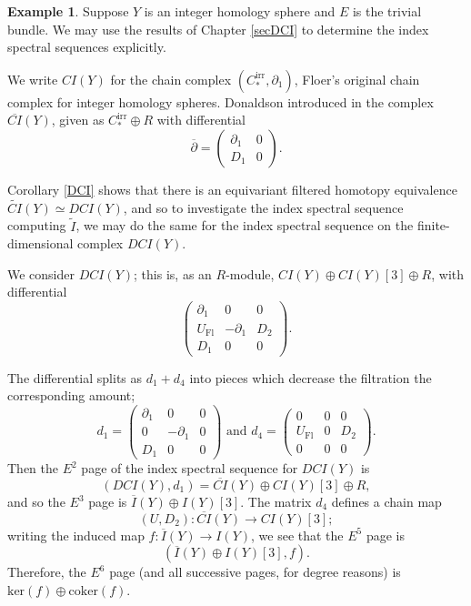 \documentclass{memo-l}
\theoremstyle{definition}
\newtheorem{example}[theorem]{Example}
\theoremstyle{remark}
\numberwithin{section}{chapter}
\numberwithin{equation}{chapter}
\begin{document}
\begin{example} Suppose $Y$ is an integer homology sphere and $E$ is the trivial bundle. We may use the results of Chapter \ref{secDCI} to determine the index spectral sequences explicitly.

We write $CI(Y)$ for the chain complex $(C_*^{\text{irr}}, \partial_1)$, Floer's original chain complex for integer homology spheres. Donaldson introduced in \cite[Section~7.1]{Don} the complex $\overline{CI}(Y)$, given as $C_*^{\text{irr}} \oplus R$ with differential $$\overline \partial = \begin{pmatrix}\partial_1 & 0 \\ D_1 & 0\end{pmatrix}.$$

Corollary \ref{DCI} shows that there is an equivariant filtered homotopy equivalence $\widetilde{CI}(Y) \simeq DCI(Y)$, and so to investigate the index spectral sequence computing $\tilde I$, we may do the same for the index spectral sequence on the finite-dimensional complex $DCI(Y)$. 

We consider $DCI(Y)$; this is, as an $R$-module, $CI(Y) \oplus CI(Y)[3] \oplus R$, with differential $$\begin{pmatrix}\partial_1 & 0 & 0 \\ U_\text{Fl} & -\partial_1 & D_2 \\ D_1 & 0 & 0\end{pmatrix}.$$ 

The differential splits as $d_1 + d_4$ into pieces which decrease the filtration the corresponding amount; 
$$d_1 = \begin{pmatrix}\partial_1 & 0 & 0 \\ 
0 & -\partial_1 & 0\\ 
D_1 & 0 & 0\end{pmatrix} \text{ and } d_4 =  \begin{pmatrix}0 & 0 & 0 \\ 
U_\text{Fl} & 0 & D_2 \\ 
0 & 0 & 0\end{pmatrix}.$$ 
Then the $E^2$ page of the index spectral sequence for $DCI(Y)$ is $$(DCI(Y), d_1) = \overline{CI}(Y) \oplus CI(Y)[3] \oplus R,$$ and so the $E^3$ page is $\overline{I}(Y) \oplus I(Y)[3]$. The matrix $d_4$ defines a chain map $$(U, D_2): \overline{CI}(Y) \to CI(Y)[3];$$ writing the induced map $f: \overline{I}(Y) \to I(Y)$, we see that the $E^5$ page is $$(\overline{I}(Y) \oplus I(Y)[3], f).$$ Therefore, the $E^6$ page (and all successive pages, for degree reasons) is $\text{ker}(f) \oplus \text{coker}(f)$.


\end{example}
\end{document}
